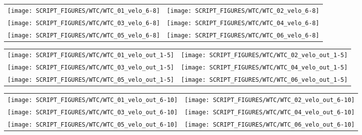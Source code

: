 \begin{figure}[p]
\begin{tabular*}{\textwidth}{l@{\extracolsep{\fill}}r}
\texttt{[image: SCRIPT\_FIGURES/WTC/WTC\_01\_velo\_6-8]} &
\texttt{[image: SCRIPT\_FIGURES/WTC/WTC\_02\_velo\_6-8]} \\
\texttt{[image: SCRIPT\_FIGURES/WTC/WTC\_03\_velo\_6-8]} &
\texttt{[image: SCRIPT\_FIGURES/WTC/WTC\_04\_velo\_6-8]} \\
\texttt{[image: SCRIPT\_FIGURES/WTC/WTC\_05\_velo\_6-8]} &
\texttt{[image: SCRIPT\_FIGURES/WTC/WTC\_06\_velo\_6-8]}
\end{tabular*}
\label{WTC_velo_6-8}
\end{figure}

\begin{figure}[p]
\begin{tabular*}{\textwidth}{l@{\extracolsep{\fill}}r}
\texttt{[image: SCRIPT\_FIGURES/WTC/WTC\_01\_velo\_out\_1-5]} &
\texttt{[image: SCRIPT\_FIGURES/WTC/WTC\_02\_velo\_out\_1-5]} \\
\texttt{[image: SCRIPT\_FIGURES/WTC/WTC\_03\_velo\_out\_1-5]} &
\texttt{[image: SCRIPT\_FIGURES/WTC/WTC\_04\_velo\_out\_1-5]} \\
\texttt{[image: SCRIPT\_FIGURES/WTC/WTC\_05\_velo\_out\_1-5]} &
\texttt{[image: SCRIPT\_FIGURES/WTC/WTC\_06\_velo\_out\_1-5]}
\end{tabular*}
\label{WTC_velo_out_1-5}
\end{figure}

\begin{figure}[p]
\begin{tabular*}{\textwidth}{l@{\extracolsep{\fill}}r}
\texttt{[image: SCRIPT\_FIGURES/WTC/WTC\_01\_velo\_out\_6-10]} &
\texttt{[image: SCRIPT\_FIGURES/WTC/WTC\_02\_velo\_out\_6-10]} \\
\texttt{[image: SCRIPT\_FIGURES/WTC/WTC\_03\_velo\_out\_6-10]} &
\texttt{[image: SCRIPT\_FIGURES/WTC/WTC\_04\_velo\_out\_6-10]} \\
\texttt{[image: SCRIPT\_FIGURES/WTC/WTC\_05\_velo\_out\_6-10]} &
\texttt{[image: SCRIPT\_FIGURES/WTC/WTC\_06\_velo\_out\_6-10]}
\end{tabular*}
\label{WTC_velo_out_6-10}
\end{figure}



\clearpage

